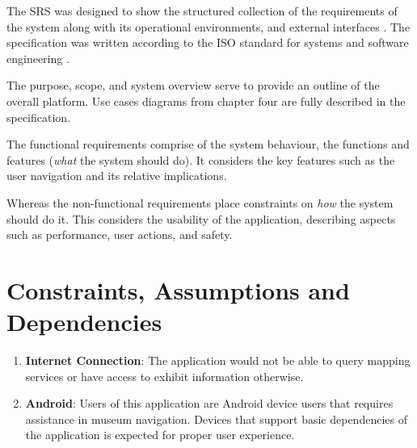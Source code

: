 

{
The SRS was designed to show the structured collection of the requirements of the system along with its operational environments, and external interfaces \cite{IEEE24765}. The specification was written according to the ISO standard for systems and software engineering \cite{IEEE29148}.

The purpose, scope, and system overview serve to provide an outline of the overall platform. Use cases diagrams from chapter four are fully described in the specification.

The functional requirements comprise of the system behaviour, the functions and features (\textit{what} the system should do). It considers the key features such as the user navigation and its relative implications.

Whereas the non-functional requirements place constraints on \textit{how} the system should do it. This considers the usability of the application, describing aspects such as performance, user actions, and safety.

\section*{Constraints, Assumptions and Dependencies}
\begin{enumerate}
    \item \textbf{Internet Connection}: The application would not be able to query mapping services or have access to exhibit information otherwise.
    \item \textbf{Android}: Users of this application are Android device users that requires assistance in museum navigation. Devices that support basic dependencies of the application is expected for proper user experience.
\end{enumerate}

}
